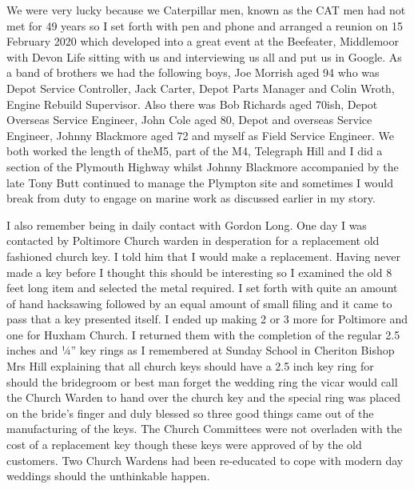 We were very lucky because we Caterpillar men, known as the CAT men had not met
for 49 years so I set forth with pen and phone and arranged a reunion on 15
February 2020 which developed into a great event at the Beefeater, Middlemoor
with Devon Life sitting with us and interviewing us all and put us in Google.
As a band of brothers we had the following boys, Joe Morrish aged 94 who was
Depot Service Controller, Jack Carter, Depot Parts Manager and Colin Wroth,
Engine Rebuild Supervisor. Also there was Bob Richards aged 70ish, Depot
Overseas Service Engineer, John Cole aged 80, Depot and overseas Service
Engineer, Johnny Blackmore aged 72 and myself as Field Service Engineer. We
both worked the length of theM5, part of the M4, Telegraph Hill and I did a
section of the Plymouth Highway whilst Johnny Blackmore accompanied by the late
Tony Butt continued to manage the Plympton site and sometimes I would break
from duty to engage on marine work as discussed earlier in my story.

I also remember being in daily contact with Gordon Long. One day I was
contacted by Poltimore Church warden in desperation for a replacement old
fashioned church key. I told him that I would make a replacement. Having
never made a key before I thought this should be interesting so I examined the
old 8 feet long item and selected the metal required. I set forth with quite
an amount of hand hacksawing followed by an equal amount of small filing and it
came to pass that a key presented itself. I ended up making 2 or 3 more for
Poltimore and one for Huxham Church. I returned them with the completion of
the regular 2.5 inches and ¼'' key rings as I remembered at Sunday School in
Cheriton Bishop Mrs Hill explaining that all church keys should have a 2.5 inch
key ring for should the bridegroom or best man forget the wedding ring the
vicar would call the Church Warden to hand over the church key and the special
ring was placed on the bride's finger and duly blessed so three good things
came out of the manufacturing of the keys. The Church Committees were not
overladen with the cost of a replacement key though these keys were approved of
by the old customers. Two Church Wardens had been re-educated to cope with
modern day weddings should the unthinkable happen.

